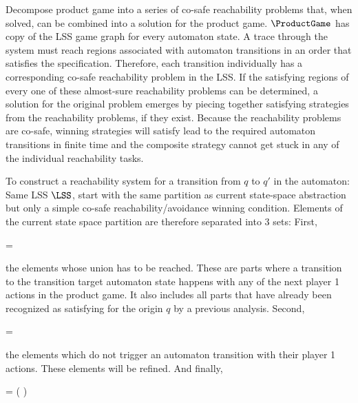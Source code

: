 Decompose product game into a series of co-safe reachability problems that, when solved, can be combined into a solution for the product game.
$\ProductGame$ has copy of the LSS game graph for every automaton state.
A trace through the system must reach regions associated with automaton transitions in an order that satisfies the specification.
Therefore, each transition individually has a corresponding co-safe reachability problem in the LSS.
If the satisfying regions of every one of these almost-sure reachability problems can be determined, a solution for the original problem emerges by piecing together satisfying strategies from the reachability problems, if they exist.
Because the reachability problems are co-safe, winning strategies will satisfy lead to the required automaton transitions in finite time and the composite strategy cannot get stuck in any of the individual reachability tasks.

To construct a reachability system for a transition from $q$ to $q'$ in the automaton:
Same LSS $\LSS$, start with the same partition as current state-space abstraction but only a simple co-safe reachability/avoidance winning condition.
Elements of the current state space partition are therefore separated into 3 sets:
First,

\startformula
     =  \EndComma
\stopformula

the elements whose union has to be reached.
These are parts where a transition to the transition target automaton state happens with any of the next player 1 actions in the product game.
It also includes all parts that have already been recognized as satisfying for the origin $q$ by a previous analysis.
Second,

\startformula
     =  \EndComma
\stopformula

the elements which do not trigger an automaton transition with their player 1 actions.
These elements will be refined.
And finally,

\startformula
     =  \setminus \left(  \cup {} \right) \EndComma
\stopformula


